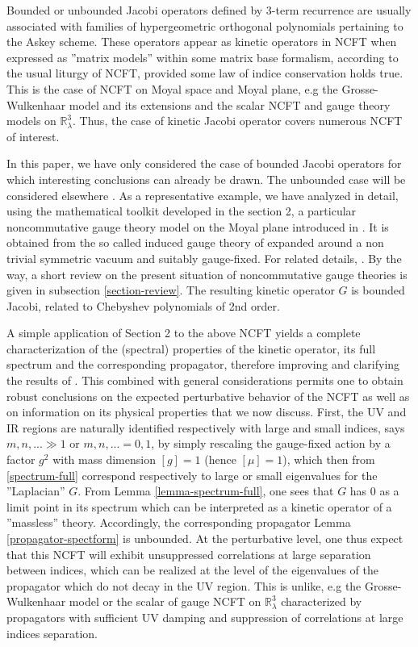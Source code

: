 \documentclass[a4paper]{jpconf}
\numberwithin{equation}{section}
\theoremstyle{nonumberplain}
\begin{document}
Bounded or unbounded Jacobi operators defined by 3-term recurrence are usually associated with families of hypergeometric orthogonal polynomials pertaining to the Askey scheme. These operators appear as kinetic operators in NCFT when expressed as ''matrix models'' within some matrix base formalism, according to the usual liturgy of NCFT, provided some law of indice conservation holds true. This is the case of NCFT on Moyal space and Moyal plane, e.g the Grosse-Wulkenhaar model and its extensions and the scalar NCFT and gauge theory models on $\mathbb{R}^3_\lambda$. Thus, the case of kinetic Jacobi operator covers numerous NCFT of interest. \par
In this paper, we have only considered the case of bounded Jacobi operators for which interesting conclusions can already be drawn. The unbounded case will be considered elsewhere \cite{unboud-jac}. As a representative example, we have analyzed in detail, using the mathematical toolkit developed in the section 2, a particular noncommutative gauge theory model on the Moyal plane introduced in \cite{MVW13}. It is obtained from the so called induced gauge theory of \cite{GWW,GW07} expanded around a non trivial symmetric vacuum and suitably gauge-fixed. For related details, \cite{MVW13}. By the way, a short review on the present situation of noncommutative gauge theories is given in subsection \ref{section-review}. The resulting kinetic operator $G$ is bounded Jacobi, related to Chebyshev polynomials of 2nd order.\par 
A simple application of Section 2 to the above NCFT yields a complete characterization of the (spectral) properties of the kinetic operator, its full spectrum and the corresponding propagator, therefore improving and clarifying the results of \cite{MVW13}. This combined with general considerations permits one to obtain robust conclusions on the expected perturbative behavior of the NCFT as well as on information on its physical properties that we now discuss. First, the UV and IR regions are naturally identified respectively with large and small indices, says $m,n,...\gg 1$ or $m,n,... =0,1$, by simply rescaling the gauge-fixed action by a factor $g^2$ with mass dimension $[g]=1$ (hence $[\mu]=1$), which then from \eqref{spectrum-full} correspond respectively to large or small eigenvalues for the ''Laplacian'' $G$.
From Lemma \ref{lemma-spectrum-full}, one sees that $G$ has $0$ as a limit point in its spectrum which can be interpreted as a kinetic operator of a ''massless'' theory. Accordingly, the corresponding propagator Lemma \ref{propagator-spectform} is unbounded. At the perturbative level, one thus expect that this NCFT will exhibit unsuppressed correlations at large separation between indices, which can be realized at the level of the eigenvalues of the propagator which do not decay in the UV region. This is unlike, e.g the Grosse-Wulkenhaar model \cite{gw1,gw2} or the scalar of gauge NCFT on $\mathbb{R}^3_\lambda$ \cite{gvw13} characterized by propagators with sufficient UV damping and suppression of correlations at large indices separation.\par
\end{document}
